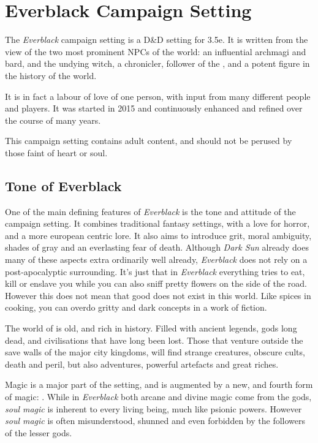 \chapter{Everblack Campaign Setting}

The \emph{Everblack} campaign setting is a D\&D setting for 3.5e.  It is
written from the view of the two most prominent NPCs of the world:
 an influential archmagi and bard, and
 the undying witch, a chronicler, follower of the
, and a potent figure in the history of the
world.

It is in fact a labour of love of one person, with input from many different
people and players. It was started in 2015 and continuously enhanced and
refined over the course of many years.

This campaign setting contains adult content, and should not be perused by
those faint of heart or soul.

\section{Tone of Everblack}

One of the main defining features of \emph{Everblack} is the tone and attitude
of the campaign setting. It combines traditional fantasy settings, with a love
for horror, and a more european centric lore. It also aims to introduce grit,
moral ambiguity, shades of gray and an everlasting fear of death. Although
\emph{Dark Sun} already does many of these aspects extra ordinarily well
already, \emph{Everblack} does not rely on a post-apocalyptic surrounding.
It's just that in \emph{Everblack} everything tries to eat, kill or enslave
you while you can also sniff pretty flowers on the side of the road. However
this does not mean that good does not exist in this world. Like spices in
cooking, you can overdo gritty and dark concepts in a work of fiction.

The world of  is old, and rich in history. Filled with
ancient legends, gods long dead, and civilisations that have long been lost.
Those that venture outside the save walls of the major city kingdoms, will
find strange creatures, obscure cults, death and peril, but also adventures,
powerful artefacts and great riches.

Magic is a major part of the setting, and is augmented by a new, and fourth
form of magic: . While in \emph{Everblack} both arcane
and divine magic come from the gods, \emph{soul magic} is inherent to every
living being, much like psionic powers. However \emph{soul magic} is often
misunderstood, shunned and even forbidden by the followers of the lesser gods.

